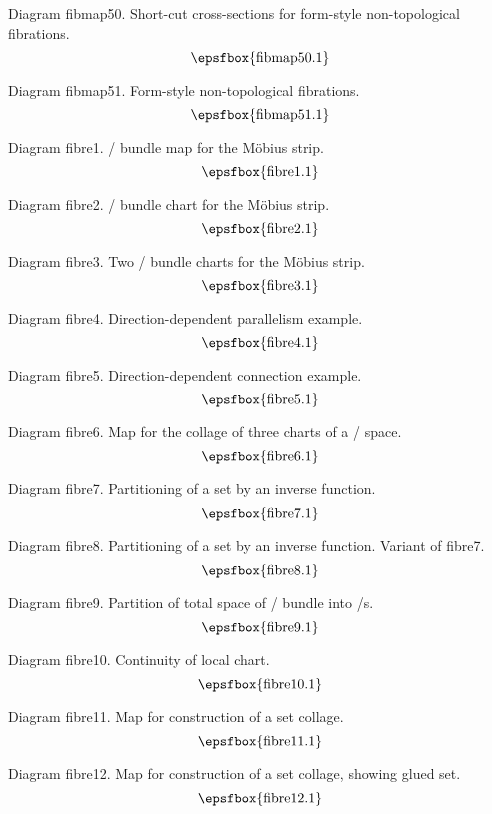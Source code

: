 \filleject

Diagram fibmap50. Short-cut cross-sections for form-style non-topological
fibrations.
$$
\centerline{\epsfbox{fibmap50.1}}
$$

Diagram fibmap51. Form-style non-topological fibrations.
$$
\centerline{\epsfbox{fibmap51.1}}
$$

\secteject
\edef\SECTfibre{\the\pageno}

Diagram fibre1. \Fibre/ bundle map for the M\"obius strip.
$$
\centerline{\epsfbox{fibre1.1}}
$$

Diagram fibre2. \Fibre/ bundle chart for the M\"obius strip.
$$
\centerline{\epsfbox{fibre2.1}}
$$

Diagram fibre3. Two \fibre/ bundle charts for the M\"obius strip.
$$
\centerline{\epsfbox{fibre3.1}}
$$

\filleject

Diagram fibre4. Direction-dependent parallelism example.
$$
\centerline{\epsfbox{fibre4.1}}
$$

Diagram fibre5. Direction-dependent connection example.
$$
\centerline{\epsfbox{fibre5.1}}
$$

Diagram fibre6. Map for the collage of three charts of a \fibre/ space.
$$
\centerline{\epsfbox{fibre6.1}}
$$

Diagram fibre7. Partitioning of a set by an inverse function.
$$
\centerline{\epsfbox{fibre7.1}}
$$

\filleject

Diagram fibre8. Partitioning of a set by an inverse function. Variant of fibre7.
$$
\centerline{\epsfbox{fibre8.1}}
$$

Diagram fibre9. Partition of total space of \fibre/ bundle into \fibre/s.
$$
\centerline{\epsfbox{fibre9.1}}
$$

Diagram fibre10. Continuity of local chart.
$$
\centerline{\epsfbox{fibre10.1}}
$$

Diagram fibre11. Map for construction of a set collage.
$$
\centerline{\epsfbox{fibre11.1}}
$$

\filleject

Diagram fibre12. Map for construction of a set collage, showing glued set.
$$
\centerline{\epsfbox{fibre12.1}}
$$


